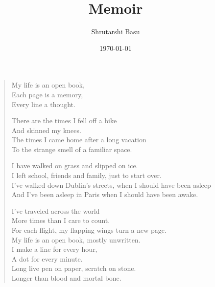 \documentclass[12pt,letterpaper]{article}
\title{Memoir}
\author{Shrutarshi Basu}
\date{\today}
\begin{document}
\maketitle
\begin{verse}

 My life is an open book,\\
 Each page is a memory,\\
 Every line a thought.  


 There are the times I fell off a bike\\
 And skinned my knees.\\
 The times I came home after a long vacation\\
 To the strange smell of a familiar space.  


 I have walked on grass and slipped on ice.\\
 I left school, friends and family, just to start over.\\
 I've walked down Dublin's streets, when I should have been asleep\\
 And I've been asleep in Paris when I should have been awake.  


 I've traveled across the world\\
 More times than I care to count.\\
 For each flight, my flapping wings turn a new page.\\
 My life is an open book, mostly unwritten.\\
 I make a line for every hour,\\
 A dot for every minute.\\
 Long live pen on paper, scratch on stone.\\
 Longer than blood and mortal bone.  

\end{verse}

\end{document}
